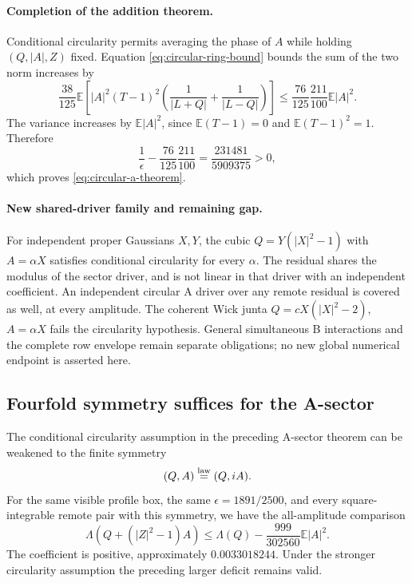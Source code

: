 \paragraph{Completion of the addition theorem.}
Conditional circularity permits averaging the phase of $A$ while holding
$(Q,|A|,Z)$ fixed. Equation \eqref{eq:circular-ring-bound} bounds the sum
of the two norm increases by
\[
 \frac{38}{125}\mathbb E\left[
 |A|^2(T-1)^2\left(\frac1{|L+Q|}+\frac1{|L-Q|}\right)\right]
 \le\frac{76}{125}\frac{211}{100}\mathbb E|A|^2.
\]
The variance increases by $\mathbb E|A|^2$, since
$\mathbb E(T-1)=0$ and $\mathbb E(T-1)^2=1$. Therefore
\[
 \frac1\epsilon-\frac{76}{125}\frac{211}{100}
 =\frac{231481}{5909375}>0,
\]
which proves \eqref{eq:circular-a-theorem}.

\paragraph{New shared-driver family and remaining gap.}
For independent proper Gaussians $X,Y$, the cubic
$Q=Y(|X|^2-1)$ with $A=\alpha X$ satisfies conditional circularity for
every $\alpha$. The residual shares the modulus of the sector driver,
and is not linear in that driver with an independent coefficient.
An independent circular A driver over any remote residual is covered as
well, at every amplitude. The coherent Wick junta
$Q=cX(|X|^2-2)$, $A=\alpha X$ fails the circularity hypothesis.
General simultaneous B interactions and the complete row envelope remain
separate obligations; no new global numerical endpoint is asserted here.


\subsection{Fourfold symmetry suffices for the A-sector}
\label{sec:c4-a-addition}

The conditional circularity assumption in the preceding A-sector theorem
can be weakened to the finite symmetry
\[
 (Q,A)\overset{\rm law}=(Q,iA).
\]
For the same visible profile box, the same $\epsilon=1891/2500$, and every
square-integrable remote pair with this symmetry, we have the all-amplitude
comparison
\begin{equation}\label{eq:c4-a-theorem}
 \boxed{\Lambda(Q+(|Z|^2-1)A)\le\Lambda(Q)
       -\frac{999}{302560}\mathbb E|A|^2.}
\end{equation}
The coefficient is positive, approximately $0.0033018244$. Under the
stronger circularity assumption the preceding larger deficit remains valid.

